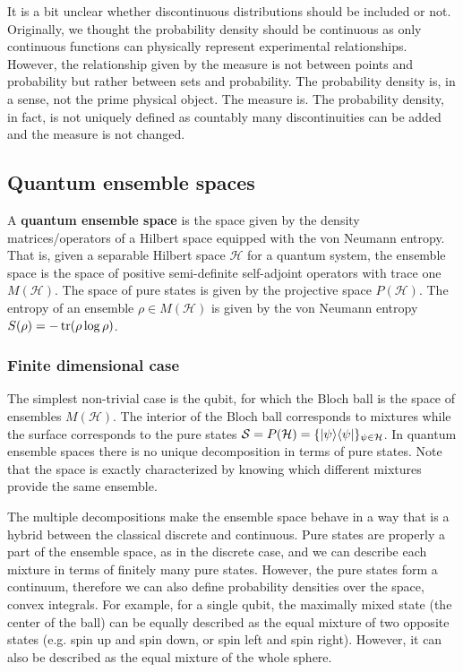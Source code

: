 It is a bit unclear whether discontinuous distributions should be included or not. Originally, we thought the probability density should be continuous as only continuous functions can physically represent experimental relationships. However, the relationship given by the measure is not between points and probability but rather between sets and probability. The probability density is, in a sense, not the prime physical object. The measure is. The probability density, in fact, is not uniquely defined as countably many discontinuities can be added and the measure is not changed.

\subsection{Quantum ensemble spaces}

\begin{defn}
	A \textbf{quantum ensemble space} is the space given by the density matrices/operators of a Hilbert space equipped with the von Neumann entropy. That is, given a separable Hilbert space $\mathcal{H}$ for a quantum system, the ensemble space is the space of positive semi-definite self-adjoint operators with trace one $M(\mathcal{H})$. The space of pure states is given by the projective space $P(\mathcal{H})$. The entropy of an ensemble $\rho \in M(\mathcal{H})$ is given by the von Neumann entropy $S(\rho) = -\operatorname{tr}(\rho \log \rho)$.
\end{defn}

\subsubsection{Finite dimensional case}

The simplest non-trivial case is the qubit, for which the Bloch ball is the space of ensembles $M(\mathcal{H})$. The interior of the Bloch ball corresponds to mixtures  while the surface corresponds to the pure states $\mathcal{S} = P(\mathcal{H}) = \{ |\psi\rangle \langle\psi| \}_{\psi \in \mathcal{H}}$. In quantum ensemble spaces there is no unique decomposition in terms of pure states. Note that the space is exactly characterized by knowing which different mixtures provide the same ensemble.

The multiple decompositions make the ensemble space behave in a way that is a hybrid between the classical discrete and continuous. Pure states are properly a part of the ensemble space, as in the discrete case, and we can describe each mixture in terms of finitely many pure states. However, the pure states form a continuum, therefore we can also define probability densities over the space, convex integrals. For example, for a single qubit, the maximally mixed state (the center of the ball) can be equally described as the equal mixture of two opposite states (e.g. spin up and spin down, or spin left and spin right). However, it can also be described as the equal mixture of the whole sphere.

